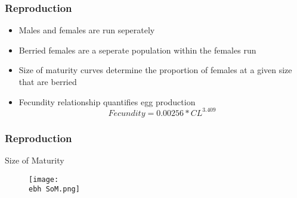 \documentclass{beamer}
\newcommand{\ebh}{\string~/bio.data/bio.lobster/figures/LFA2733Framework2018/} %
\begin{document}
%
%
%
%
%
%
%
%



\begin{frame}
\frametitle{Reproduction}
\begin{itemize}
\item Males and females are run seperately
\item Berried females are a seperate population within the females run
\item Size of maturity curves determine the proportion of females at a given size that are berried
\item Fecundity relationship quantifies egg production
\begin{equation*}
Fecundity = 0.00256 * CL^3.409
\end{equation*}
\end{itemize}
\end{frame}


\begin{frame}
\frametitle{Reproduction}
Size of Maturity
\begin{figure}
        \begin{center}
            \texttt{[image: \\ebh SoM.png]}
        \end{center}
    \end{figure}
\end{frame}


%
%
\end{document}
